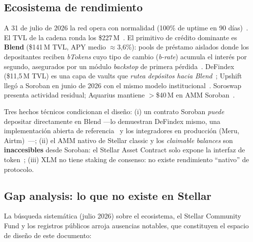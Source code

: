 \documentclass[twocolumn,10pt]{article}
\begin{document}
\subsection{Ecosistema de rendimiento}

A 31 de julio de 2026 la red opera con normalidad (100\% de uptime en 90 d\'ias)~\cite{status}. El TVL de la cadena ronda los \$227\,M~\cite{defillama}. El primitivo de cr\'edito dominante es \textbf{Blend} (\$141\,M TVL, APY medio $\approx$3{,}6\%): pools de pr\'estamo aislados donde los depositantes reciben \emph{bTokens} cuyo tipo de cambio (\emph{b-rate}) acumula el inter\'es por segundo, asegurados por un m\'odulo \emph{backstop} de primera p\'erdida~\cite{blendwp}. DeFindex (\$11{,}5\,M TVL) es una capa de vaults que \emph{rutea dep\'ositos hacia Blend}~\cite{composability}; Upshift lleg\'o a Soroban en junio de 2026 con el mismo modelo institucional~\cite{upshift}. Soroswap presenta actividad residual; Aquarius mantiene $>$\$40\,M en AMM Soroban~\cite{defillama}.

Tres hechos t\'ecnicos condicionan el dise\~no: (i) un contrato Soroban \emph{puede} depositar directamente en Blend ---lo demuestran DeFindex mismo, una implementaci\'on abierta de referencia~\cite{blendvault} y los integradores en producci\'on (Meru, Airtm)~\cite{meru}---; (ii) el AMM nativo de Stellar classic y los \emph{claimable balances} son \textbf{inaccesibles} desde Soroban: el Stellar Asset Contract solo expone la interfaz de token~\cite{sac}; (iii) XLM no tiene staking de consenso: no existe rendimiento ``nativo'' de protocolo.

\subsection{Gap analysis: lo que no existe en Stellar}
\label{sec:gaps}

La b\'usqueda sistem\'atica (julio 2026) sobre el ecosistema, el Stellar Community Fund y los registros p\'ublicos arroja ausencias notables, que constituyen el espacio de dise\~no de este documento:
\end{document}
